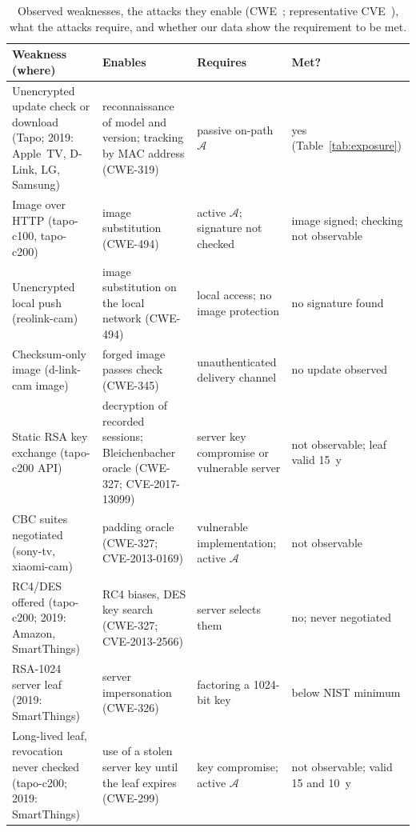 \begin{table}[!t]
    \centering
    \color{blue}
    \caption{Observed weaknesses, the attacks they enable (CWE~\cite{mitre-cwe}; representative CVE~\cite{CVE_Program}), what the attacks require, and whether our data show the requirement to be met.}
    \label{tab:preconditions}
    \setlength{\tabcolsep}{2pt}
    \footnotesize
    \begin{tabular}{@{} >{\raggedright\arraybackslash}p{2.1cm} >{\raggedright\arraybackslash}p{2.05cm} >{\raggedright\arraybackslash}p{1.8cm} >{\raggedright\arraybackslash}p{2.05cm} @{}}
        \toprule
        \textbf{Weakness (where)} & \textbf{Enables} & \textbf{Requires} & \textbf{Met?} \\
        \midrule
        Unencrypted update check or download (Tapo; 2019: Apple~TV, D-Link, LG, Samsung) & reconnaissance of model and version; tracking by MAC address (CWE-319) & passive on-path $\mathcal{A}$ & yes (Table~\ref{tab:exposure}) \\
        \addlinespace
        Image over HTTP (tapo-c100, tapo-c200) & image substitution (CWE-494) & active $\mathcal{A}$; signature not checked & image signed; checking not observable \\
        \addlinespace
        Unencrypted local push (reolink-cam) & image substitution on the local network (CWE-494) & local access; no image protection & no signature found \\
        \addlinespace
        Checksum-only image (d-link-cam image) & forged image passes check (CWE-345) & unauthenticated delivery channel & no update observed \\
        \addlinespace
        Static RSA key exchange (tapo-c200 API) & decryption of recorded sessions; Bleichenbacher oracle (CWE-327; CVE-2017-13099) & server key compromise or vulnerable server & not observable; leaf valid 15~y \\
        \addlinespace
        CBC suites negotiated (sony-tv, xiaomi-cam) & padding oracle (CWE-327; CVE-2013-0169) & vulnerable implementation; active $\mathcal{A}$ & not observable \\
        \addlinespace
        RC4/DES offered (tapo-c200; 2019: Amazon, SmartThings) & RC4 biases, DES key search (CWE-327; CVE-2013-2566) & server selects them & no; never negotiated \\
        \addlinespace
        RSA-1024 server leaf (2019: SmartThings) & server impersonation (CWE-326) & factoring a 1024-bit key & below NIST minimum \\
        \addlinespace
        Long-lived leaf, revocation never checked (tapo-c200; 2019: SmartThings) & use of a stolen server key until the leaf expires (CWE-299) & key compromise; active $\mathcal{A}$ & not observable; valid 15 and 10~y \\
        \bottomrule
    \end{tabular}
\end{table}
